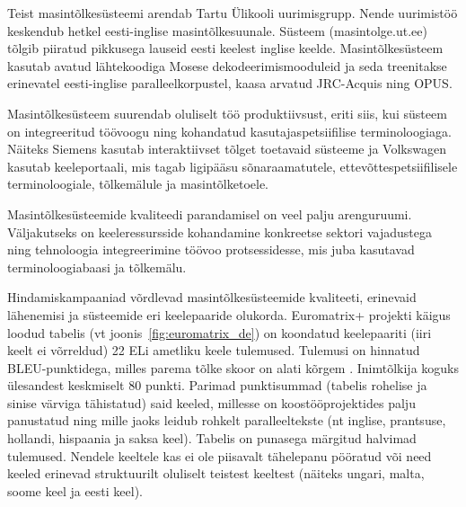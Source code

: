 \documentclass[]{../metanetpaper}
\begin{document}
\begin{multicols}{2}
Teist masintõlkesüsteemi arendab Tartu Ülikooli uurimisgrupp. 
Nende uurimistöö keskendub hetkel eesti-inglise masintõlkesuunale. 
Süsteem (masintolge.ut.ee) tõlgib piiratud pikkusega lauseid eesti keelest inglise keelde. 
Masintõlkesüsteem kasutab avatud lähtekoodiga Mosese dekodeerimismooduleid ja seda treenitakse erinevatel eesti-inglise paralleelkorpustel, kaasa arvatud JRC-Acquis ning OPUS. 

Masintõlkesüsteem suurendab oluliselt töö produktiivsust, eriti siis, kui süsteem on integreeritud töövoogu ning kohandatud kasutajaspetsiifilise terminoloogiaga. 
Näiteks Siemens kasutab interaktiivset tõlget toetavaid süsteeme ja Volkswagen kasutab keeleportaali, mis tagab ligipääsu sõnaraamatutele, ettevõttespetsiifilisele terminoloogiale, tõlkemälule ja masintõlketoele. 

Masintõlkesüsteemide kvaliteedi parandamisel on veel palju arenguruumi. 
Väljakutseks on keeleressursside kohandamine konkreetse sektori vajadustega ning tehnoloogia integreerimine töövoo protsessidesse, mis juba kasutavad terminoloogiabaasi ja tõlkemälu. 

Hindamiskampaaniad võrdlevad masintõlkesüsteemide kvaliteeti, erinevaid lähenemisi ja süsteemide eri keelepaaride olukorda. 
Euromatrix+ projekti käigus loodud tabelis (vt joonis~\ref{fig:euromatrix_de}) on koondatud keelepaariti (iiri keelt ei võrreldud) 22 ELi ametliku keele tulemused. 
Tulemusi on hinnatud BLEU-punktidega, milles parema tõlke skoor on alati kõrgem \cite{bleu1}. 
Inimtõlkija koguks ülesandest keskmiselt 80 punkti. 
Parimad punktisummad (tabelis rohelise ja sinise värviga tähistatud) said keeled, millesse on koostööprojektides palju panustatud ning mille jaoks leidub rohkelt paralleeltekste (nt inglise, prantsuse, hollandi, hispaania ja saksa keel). 
Tabelis on punasega märgitud halvimad tulemused. 
Nendele keeltele kas ei ole piisavalt tähelepanu pööratud või need keeled erinevad struktuurilt oluliselt teistest keeltest (näiteks ungari, malta, soome keel ja eesti keel). 


\end{multicols}
\end{document}

